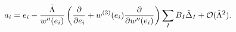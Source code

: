 \begin{equation}
a_{i}=e_{i}-\frac{\tilde{\Lambda}}{w^{\prime \prime }(e_{i})}\left( \frac{%
\partial }{\partial e_{i}}+w^{(3)}(e_{i})\frac{\partial }{\partial w^{\prime
\prime }(e_{i})}\right) \sum_{I}B_{I}\tilde{\Delta}_{I}+{\cal O}(\tilde{%
\Lambda}^{2}).
\end{equation}

